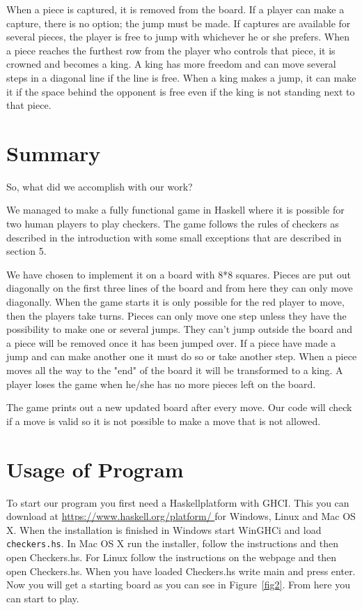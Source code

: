 \documentclass[12pt,a4paper]{article}
\begin{document}
When a piece is captured, it is removed from the board. If a player can make a capture, 
there is no option; the jump must be made. If captures are available for several pieces, 
the player is free to jump with whichever he or she prefers. When a piece reaches the 
furthest row from the player who controls that piece, it is crowned and becomes a king. 
A king has more freedom and can move several steps in a diagonal line if the line is 
free. When a king makes a jump, it can make it if the space behind the opponent is free 
even if the king is not standing next to that piece.

\section{Summary}
So, what did we accomplish with our work? 

We managed to make a fully functional game in Haskell where it is possible for two 
human players to play checkers. The game follows the rules of checkers as described 
in the introduction with some small exceptions that are described in section 5. 

We have chosen to implement it on a board with 8*8 squares.  Pieces are put out 
diagonally on the first three lines of the board and from here they can only move  
diagonally. When the game starts it is only possible for the red player to move, then 
the players take turns. Pieces can only move one step unless they have the possibility 
to make one or several jumps.
They can’t jump outside the board and a piece will be removed once it has been jumped 
over. If a piece have made a jump and can make another one it must do so or take another 
step. When a piece moves all the way to the "end" of the board it will be transformed 
to a king. A player loses the game when he/she has no more pieces left on the board.

The game prints out a new updated board after every move. Our code will check if a move 
is valid so it is not possible to make a move that is not allowed.

\section{Usage of Program}
To start our program you first need a Haskellplatform with GHCI. This you can download at 
\href{https://www.haskell.org/platform/ }{https://www.haskell.org/platform/ }for Windows, 
Linux and Mac OS X. When the installation is finished in Windows start WinGHCi and load 
\texttt{checkers.hs}. In Mac OS X run the installer, 
follow the instructions and then open Checkers.hs. For Linux follow the instructions on 
the webpage and then open Checkers.hs.
When you have loaded Checkers.hs write main and press enter. Now you will get a starting
board as you can see in Figure~\ref{fig2}. From here you can start to play. 		
\end{document}
